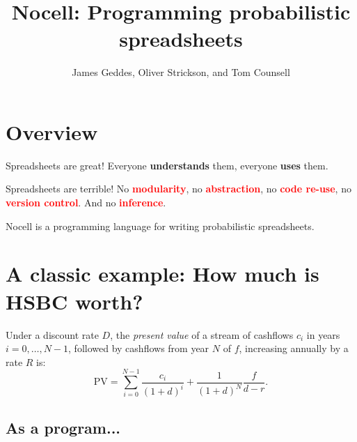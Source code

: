\documentclass[twocolumn, 12pt]{article}
\title{Nocell: Programming prob\-ab\-il\-ist\-ic spreadsheets}
\author{James Geddes, Oliver Strickson, and Tom Counsell}
\date{}
\begin{document}
\maketitle
\thispagestyle{empty}
\section*{Overview}
Spreadsheets are great! Everyone \textcolor{OliveGreen}{\bfseries understands} them, everyone
\textcolor{OliveGreen}{\bfseries uses} them.

Spreadsheets are terrible! No \textcolor{red}{\bfseries modularity}, no
\textcolor{red}{\bfseries abstraction}, no \textcolor{red}{\bfseries code re-use}, no
\textcolor{red}{\bfseries version control}. And no \textcolor{red}{\bfseries inference}.

Nocell is a programming language for writing probabilistic spreadsheets.


\section*{A classic example: How much is HSBC worth?}
\small
Under a discount rate $D$, the \emph{present value} of a stream of cashflows
$c_i$ in years $i=0,\dotsc,N-1$, followed by cashflows from year $N$ of $f$,
increasing annually by a rate $R$ is:
\[
\text{PV} = \sum_{i = 0}^{N-1} \frac{c_i}{{(1 + d)}^{i}}  +
\frac{1}{{(1+d)}^N} \frac{f}{d-r}.
\]

\subsection*{As a program...}
{\tiny
\inputminted{scheme}{dcf.nocell}
}
\end{document}
